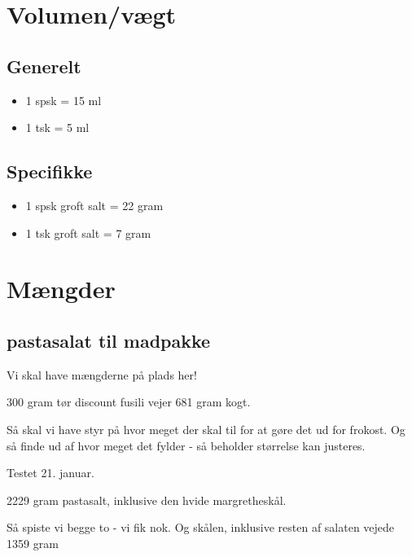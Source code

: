 \documentclass[
]{book}
\providecommand{\tightlist}{%
  \setlength{\itemsep}{0pt}\setlength{\parskip}{0pt}}
\begin{document}
\hypertarget{volumenvuxe6gt}{%
\section{Volumen/vægt}\label{volumenvuxe6gt}}

\hypertarget{generelt}{%
\subsection{Generelt}\label{generelt}}

\begin{itemize}
\tightlist
\item
  1 spsk = 15 ml
\item
  1 tsk = 5 ml
\end{itemize}

\hypertarget{specifikke}{%
\subsection{Specifikke}\label{specifikke}}

\begin{itemize}
\tightlist
\item
  1 spsk groft salt = 22 gram
\item
  1 tsk groft salt = 7 gram
\end{itemize}

\hypertarget{muxe6ngder}{%
\section{Mængder}\label{muxe6ngder}}

\hypertarget{pastasalat-til-madpakke}{%
\subsection{pastasalat til madpakke}\label{pastasalat-til-madpakke}}

Vi skal have mængderne på plads her!

300 gram tør discount fusili vejer
681 gram kogt.

Så skal vi have styr på hvor meget der skal til for at gøre det ud for frokost. Og så
finde ud af hvor meget det fylder - så beholder størrelse kan justeres.

Testet 21. januar.

2229 gram pastasalt, inklusive den hvide margretheskål.

Så spiste vi begge to - vi fik nok. Og skålen, inklusive
resten af salaten vejede 1359 gram
\end{document}
